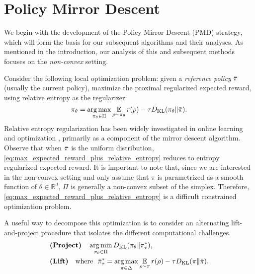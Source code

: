 
\section{Policy Mirror Descent}
\label{subsec:revisitTRPO}

\newcommand{\real}{\mathbb{R}}


We begin with the development of the Policy Mirror Descent (PMD) strategy,
which will form the basis for our subsequent algorithms and their analyses.
As mentioned in the introduction, our analysis of this and subsequent methods
focuses on the \emph{non-convex} setting.

Consider the following local optimization problem:
given a \emph{reference policy} $\bar{\pi}$ (usually the current policy), 
maximize the proximal regularized expected reward,
using relative entropy as the regularizer:
\begin{equation}
\label{eq:max_expected_reward_plus_relative_entropy}
\pi_{\theta} = \operatorname*{arg\,max}\limits_{\pi_\theta \in \Pi} { \operatorname*{\mathbb{E}}\limits_{\rho \sim \pi_\theta}{  r(\rho)  - \tau D_{\mathrm{KL}}(\pi_\theta \| \bar{\pi}) } }.
\end{equation}
Relative entropy regularization has been widely investigated in
online learning and optimization
\citep{nemirovskii1983problem,beck2003mirror},
primarily as a component of the mirror descent algorithm.
Observe that when $\bar{\pi}$ is the uniform distribution,
\cref{eq:max_expected_reward_plus_relative_entropy}
reduces to entropy regularized expected reward.
It is important to note that,
since we are interested in the non-convex setting
and only assume that
$\pi$ is parametrized as a smooth
function of $\theta \in \real^d$,
$\Pi$ is generally a non-convex subset of the simplex.
Therefore, 
\cref{eq:max_expected_reward_plus_relative_entropy}
is a difficult constrained optimization problem.

A useful way to decompose this optimization
is to consider an alternating lift-and-project procedure
that isolates the different computational challenges.
%
{\small
\begin{equation}
\label{eq:pmd}
\begin{aligned}
&\text{\bf (Project)} \quad \operatorname*{arg\,min}\limits_{\pi_\theta \in \Pi}{D_{\mathrm{KL}}( \pi_\theta \| \bar{\pi}_{\tau}^* )}, \\
&\text{\bf (Lift)}  \quad  \text{where}\ \ \bar{\pi}_{\tau}^* =  \operatorname*{arg\,max}\limits_{\pi \in \Delta}{ \operatorname*{\mathbb{E}}\limits_{\rho \sim \pi}{  r(\rho)  - \tau D_{\mathrm{KL}}(\pi \| \bar{\pi}) } }.
\end{aligned}
\end{equation}
}

